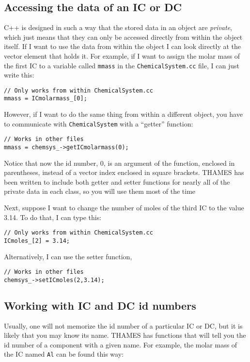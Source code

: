 \documentclass{article}
\begin{document}
\normalsize{ }
\subsection{Accessing the data of an IC or DC}
C++ is designed in such a way that the stored data in an object are \textit{private},
which just means that they can only
be accessed directly from within the object itself.  If I want to use the
data from within the object I can look directly at the vector element that
holds it.  For example, if I want to assign the molar mass of the first
IC to a variable called \verb!mmass! in the \verb!ChemicalSystem.cc! file,
I can just write this:
\begin{lstlisting}
// Only works from within ChemicalSystem.cc
mmass = ICmolarmass_[0];
\end{lstlisting}

However, if I want to do the same thing from within a different object,
you have to communicate with \verb!ChemicalSystem! with a ``getter'' function:
\begin{lstlisting}
// Works in other files
mmass = chemsys_->getICmolarmass(0);
\end{lstlisting}
Notice that now the id number, 0, is an argument of the function, enclosed in
parentheses, instead of a vector index enclosed in square brackets.
THAMES has been written to include both getter and setter functions for nearly
all of the private data in each class, so you will use them most of the time

Next, suppose I want to change the number of moles of the third IC to the value
\num{3.14}.  To do that, I can type this:
\begin{lstlisting}
// Only works from within ChemicalSystem.cc
ICmoles_[2] = 3.14;
\end{lstlisting}

Alternatively, I can use the setter function,
\begin{lstlisting}
// Works in other files
chemsys_->setICmoles(2,3.14);
\end{lstlisting}

\subsection{Working with IC and DC id numbers}
Usually, one will not memorize the id number of a particular IC or DC,
but it is likely that you may know its name.  THAMES has functions that will
tell you the id number of a component with a given name.  For example,
the molar mass of the IC named \verb!Al! can be found this way:
\end{document}
